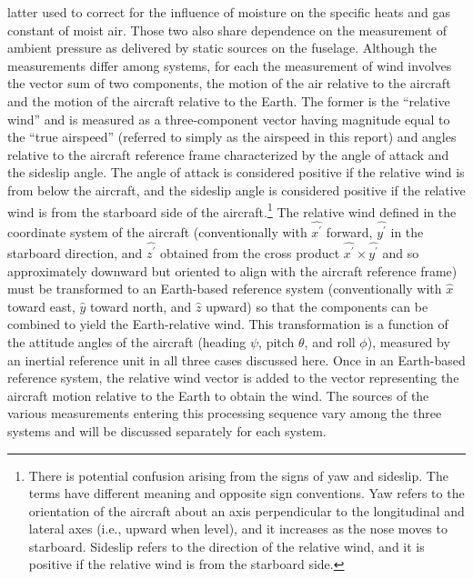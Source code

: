\documentclass[12pt,twoside,english]{article}\usepackage[]{graphicx}\usepackage[]{color}
\let\OrgIndex\index
\renewcommand*{\index}[1]{\OrgIndex{#1}}
\begin{document}
latter used to correct for the influence of moisture on the specific heats and gas constant of moist air. Those two also share dependence on the measurement of ambient pressure as delivered by static sources on the fuselage. Although the measurements differ among systems, for each the measurement of wind involves the vector sum of two components, the motion of the air relative to the aircraft and the motion of the aircraft relative to the Earth. The former is the ``relative wind'' and is measured as a three-component vector having magnitude equal to the ``true airspeed'' (referred to simply as the airspeed in this report) and angles relative to the aircraft reference frame characterized by the angle of attack and the sideslip angle. The angle of attack is considered positive if the relative wind is from below the aircraft, and the sideslip angle is considered positive if the relative wind is from the starboard side of the aircraft.\footnote{There is potential confusion arising from the signs of yaw and sideslip. The terms have different meaning and opposite sign conventions. Yaw refers to the orientation of the aircraft about an axis perpendicular to the longitudinal and lateral axes (i.e., upward when level), and it increases as the nose moves to starboard. Sideslip refers to the direction of the relative wind, and it is positive if the relative wind is from the starboard side.} The relative wind defined in the coordinate system of the aircraft (conventionally with $\hat{x^{\prime}}$ forward, $\hat{y^{\prime}}$ in the starboard direction, and $\hat{z^{\prime}}$ obtained from the cross product $\hat{x^{\prime}}\times\hat{y^{\prime}}$ and so approximately downward but oriented to align with the aircraft reference frame) must be transformed to an Earth-based reference system (conventionally with $\hat{x}$ toward east, $\hat{y}$ toward north, and $\hat{z}$ upward) so that the components can be combined to yield the Earth-relative wind. This transformation is a function of the attitude angles of the aircraft (heading $\psi$, pitch $\theta$, and roll $\phi$), measured by an inertial reference unit in all three cases discussed here. Once in an Earth-based reference system, the relative wind vector is added to the vector representing the aircraft motion relative to the Earth to obtain the wind. The sources of the various measurements entering this processing sequence vary among the three systems and will be discussed separately for each system. 
\end{document}
